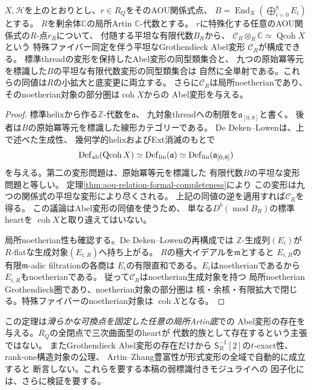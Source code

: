 \begin{theorem}[AOU形式関係式からのAbel変形の再構成]
\label{thm:aou-formal-abelian-reconstruction}
$X,\mathscr H$を上のとおりとし、$r\in R_Q$をそのAOU関係式点、
$B=\operatorname{End}_X(\bigoplus_{i=0}^{8}E_i)$とする。
$R$を剰余体$\mathbb C$の局所Artin $\mathbb C$-代数とする。
$r$に特殊化する任意のAOU関係式の$R$-点$r_R$について、
付随する平坦な有限代数$B_R$から、
$\mathcal C_R\otimes_R\mathbb C\simeq\operatorname{Qcoh}X$という
特殊ファイバー同定を伴う平坦なGrothendieck Abel変形
$\mathcal C_R$が構成できる。
標準threadの変形を保持したAbel変形の同型類集合と、
九つの原始冪等元を標識した$B$の平坦な有限代数変形の同型類集合は
自然に全単射である。これらの同値は$R$の小拡大と底変更に両立する。
さらに$\mathcal C_R$は局所noetherianであり、
そのnoetherian対象の部分圏は$\operatorname{coh}X$からの
Abel変形を与える。
\end{theorem}
\begin{proof}
標準helixから作る$\mathbb Z$-代数を$\mathfrak a$、
九対象threadへの制限を$\mathfrak a_{[0,8]}$と書く。
後者は$B$の原始冪等元を標識した線形カテゴリーである。
De Deken--Lowen\cite[Theorem 5.15]{DDL}は、上で述べた生成性、
幾何学的helixおよびExt消滅のもとで
\[
 \operatorname{Def}_{\rm ab}(\operatorname{Qcoh}X)
 \simeq\operatorname{Def}_{\rm lin}(\mathfrak a)
 \simeq\operatorname{Def}_{\rm lin}(\mathfrak a_{[0,8]})
\]
を与える。第二の変形問題は、原始冪等元を標識した
有限代数$B$の平坦な変形問題と等しい。
定理\ref{thm:aou-relation-formal-completeness}により
この変形は九つの関係式の平坦な変形により尽くされる。
上記の同値の逆を適用すれば$\mathcal C_R$を得る。
この議論はAbel変形の同値を使うため、
単なる$D^b(\operatorname{mod}B_R)$の標準heartを
$\operatorname{coh}X$と取り違えてはいない。

局所noetherian性も確認する。De Deken--Lowenの再構成では
$\mathbb Z$-生成列$(E_i)$が$R$-flatな生成対象$(E_{i,R})$へ持ち上がる。
$R$の極大イデアルを$\mathfrak m$とすると
$E_{i,R}$の有限$\mathfrak m$-adic filtrationの各商は
$E_i$の有限直和である。$E_i$はnoetherianであるから
$E_{i,R}$もnoetherianである。
従って$\mathcal C_R$はnoetherian生成対象を持つ
局所noetherian Grothendieck圏であり、noetherian対象の部分圏は
核・余核・有限拡大で閉じる。特殊ファイバーのnoetherian対象は
$\operatorname{coh}X$となる。
\end{proof}

\begin{remark}[復元の適用範囲]
\label{rem:aou-formal-heart-scope}
この定理は\emph{滑らかな可換点を固定した任意の局所Artin底}での
Abel変形の存在を与える。$R_Q$の全閉点で三次曲面型のheartが
代数的族として存在するという主張ではない。
またGrothendieck Abel変形の存在だけから
$\mathsf S_R^{-1}[2]$の$t$-exact性、rank-one構造対象の公理、
Artin--Zhang豊富性が形式変形の全域で自動的に成立すると
断言しない。これらを要する本稿の弱標識付きモジュライへの
因子化には、さらに検証を要する。
\end{remark}

